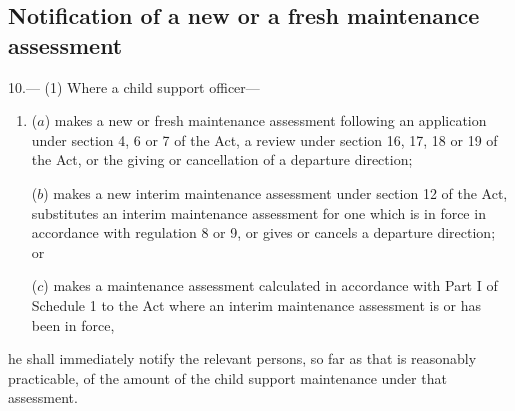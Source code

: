 \documentclass[a4paper]{article}
\newcommand{\parthead}{}
\begin{document}
\renewcommand\parthead{--- Part IV}

\subsection[10. Notification of a new or a fresh maintenance assessment]{Notification of a new or a fresh maintenance assessment}

10.—%
%
%
(1) Where a child support officer—
\begin{enumerate}\item[]
%

($a$) makes a new or fresh maintenance assessment following an application under section 4, 6 or 7 of the Act, a review under section 16, 17, 18 or 19 of the Act, or the giving or cancellation of a departure direction;

($b$) makes a new interim maintenance assessment under section 12 of the Act, substitutes an interim maintenance assessment for one which is in force in accordance with regulation 8 or 9, or gives or cancels a departure direction; or

($c$) makes a maintenance assessment calculated in accordance with Part I of Schedule 1 to the Act where an interim maintenance assessment is or has been in force,
\end{enumerate}
he shall immediately notify the relevant persons, so far as that is reasonably practicable, of the amount of the child support maintenance under that assessment.
\end{document}
